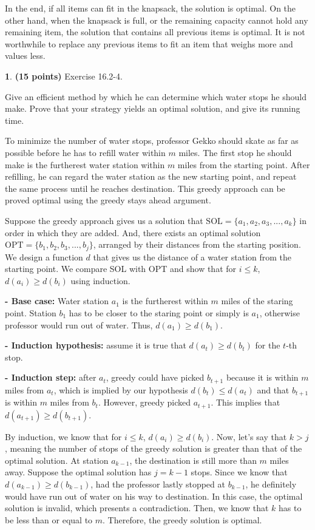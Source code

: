 \documentclass[11pt]{article}
\theoremstyle{definition}
\theoremstyle{theorem}
\newtheorem{prob}{}
\newcommand{\solution}{\medskip\noindent{\color{DarkBlue}\textbf{Solution:}}}
\begin{document}
In the end, if all items can fit in the knapsack, the solution is optimal. On the other hand, when the knapsack is full, or the remaining capacity cannot hold any remaining item, the solution that contains all previous items is optimal. It is not worthwhile to replace any previous items to fit an item that weighs more and values less. 


\newpage
\begin{prob} \textbf{(15 points)} Exercise 16.2-4.
\end{prob}
Give an efficient method by which he can determine which water stops he should make. Prove that your strategy yields an optimal solution, and give its running time.

\solution

To minimize the number of water stops, professor Gekko should skate as far as possible before he has to refill water within $m$ miles. The first stop he should make is the furtherest water station within $m$ miles from the starting point. After refilling, he can regard the water station as the new starting point, and repeat the same process until he reaches destination. This greedy approach can be proved optimal using the greedy stays ahead argument.

Suppose the greedy approach gives us a solution that $\text{SOL}=\{a_1, a_2, a_3, ..., a_k\}$ in order in which they are added. And, there exists an optimal solution $\text{OPT}=\{b_1, b_2, b_3, ..., b_j\}$, arranged by their distances from the starting position. We design a function $d$ that gives us the distance of a water station from the starting point. We compare SOL with OPT and show that for $i \le k$, $d(a_i) \ge d(b_i)$ using induction.

\textbf{- Base case:} Water station $a_1$ is the furtherest within $m$ miles of the staring point. Station $b_1$ has to be closer to the staring point or simply is $a_1$, otherwise professor would run out of water. Thus, $d(a_1) \ge d(b_1)$.

\textbf{- Induction hypothesis:} assume it is true that $d(a_t) \ge d(b_t)$ for the $t$-th stop.

\textbf{- Induction step:} after $a_t$, greedy could have picked $b_{t+1}$ because it is within $m$ miles from $a_t$, which is implied by our hypothesis $d(b_t) \le d(a_t)$ and that $b_{t+1}$ is within $m$ miles from $b_t$. However, greedy picked $a_{t+1}$. This implies that $d(a_{t+1}) \ge d(b_{t+1})$.

By induction, we know that for $i \le k$, $d(a_i) \ge d(b_i)$. Now, let's say that $k > j$, meaning the number of stops of the greedy solution is greater than that of the optimal solution. At station $a_{k-1}$, the destination is still more than $m$ miles away. Suppose the optimal solution has $j = k-1$ stops. Since we know that $d(a_{k-1}) \ge d(b_{k-1})$, had the professor lastly stopped at $b_{k-1}$, he definitely would have run out of water on his way to destination. In this case, the optimal solution is invalid, which presents a contradiction. Then, we know that $k$ has to be less than or equal to $m$. Therefore, the greedy solution is optimal.
\end{document}
